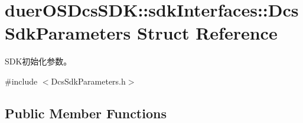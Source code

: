 \hypertarget{structduerOSDcsSDK_1_1sdkInterfaces_1_1DcsSdkParameters}{}\section{duer\+O\+S\+Dcs\+S\+DK\+:\+:sdk\+Interfaces\+:\+:Dcs\+Sdk\+Parameters Struct Reference}
\label{structduerOSDcsSDK_1_1sdkInterfaces_1_1DcsSdkParameters}


S\+D\+K初始化参数。  




{\ttfamily \#include $<$Dcs\+Sdk\+Parameters.\+h$>$}

\subsection*{Public Member Functions}
